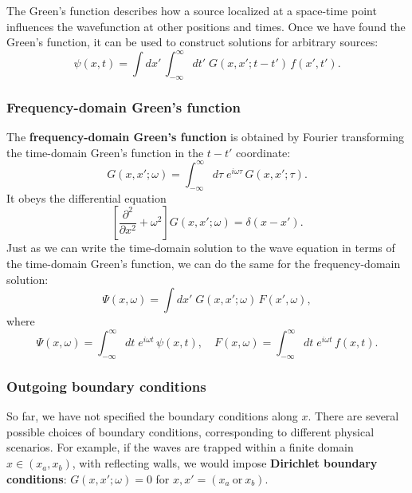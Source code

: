 \documentclass[10pt,a4paper]{article}
\begin{document}
The Green's function describes how a source localized at a space-time
point influences the wavefunction at other positions and times. Once we
have found the Green's function, it can be used to construct solutions
for arbitrary sources:
\begin{equation}
\psi(x,t) = \int dx' \,\int_{-\infty}^\infty dt'\; G(x,x';t-t') \, f(x', t').
\end{equation}

\subsubsection{Frequency-domain Green's function}
\label{frequency-domain-greens-function}

The \textbf{frequency-domain Green's function} is obtained by Fourier
transforming the time-domain Green's function in the $t-t'$
coordinate:
\begin{equation}
G(x,x';\omega) = \int_{-\infty}^\infty d\tau\; e^{i\omega \tau}\, G(x,x'; \tau).
\end{equation}
It obeys the differential equation
\begin{equation}
\left[\frac{\partial^2}{\partial x^2} + \omega^2 \right] G(x,x';\omega) = \delta(x-x').
\end{equation}
Just as we can write the time-domain solution to the wave equation in
terms of the time-domain Green's function, we can do the same for the
frequency-domain solution:
\begin{equation}
\Psi(x,\omega) = \int dx' \; G(x,x';\omega) \, F(x', \omega),
\end{equation}
where
\begin{equation}
\Psi(x,\omega) = \int_{-\infty}^\infty dt \; e^{i\omega t} \, \psi(x,t), \quad F(x,\omega) = \int_{-\infty}^\infty dt \; e^{i\omega t} \, f(x,t).
\end{equation}

\subsubsection{Outgoing boundary conditions}
\label{outgoing-boundary-conditions}

So far, we have not specified the boundary conditions along $x$.
There are several possible choices of boundary conditions,
corresponding to different physical scenarios.  For example, if the
waves are trapped within a finite domain $x \in (x_a,x_b)$, with
reflecting walls, we would impose \textbf{Dirichlet boundary
  conditions}: $G(x,x';\omega) = 0$ for $x,x' =
(x_a~\mathrm{or}~x_b)$.
\end{document}
